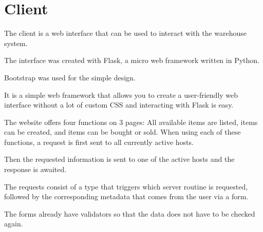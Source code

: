 \section{Client}\label{sec:Client}
The client is a web interface that can be used to interact with the warehouse system.

The interface was created with Flask, a micro web framework written in Python.

Bootstrap was used for the simple design.

It is a simple web framework that allows you to create a user-friendly web interface without a lot of custom CSS and interacting with Flask is easy.

The website offers four functions on 3 pages: All available items are listed, items can be created, and items can be bought or sold. When using each of
these functions, a request is first sent to all currently active hosts. 

Then the requested information is sent to one of the active hosts and the response is awaited. 

The requests consist of a type that triggers which server routine is requested, 
followed by the corresponding metadata that comes from the user via a form. 

The forms already have validators so that the data does not have to be checked again.